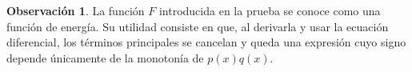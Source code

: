 \documentclass[12pt,a4paper]{article}
\theoremstyle{definition}
\newtheorem{observacion}[teorema]{Observación}
\begin{document}
\begin{observacion}
La función \(F\) introducida en la prueba se conoce como una función de energía. Su utilidad consiste en que, al derivarla y usar la ecuación diferencial, los términos principales se cancelan y queda una expresión cuyo signo depende únicamente de la monotonía de \(p(x)q(x)\).
\end{observacion}
\end{document}
